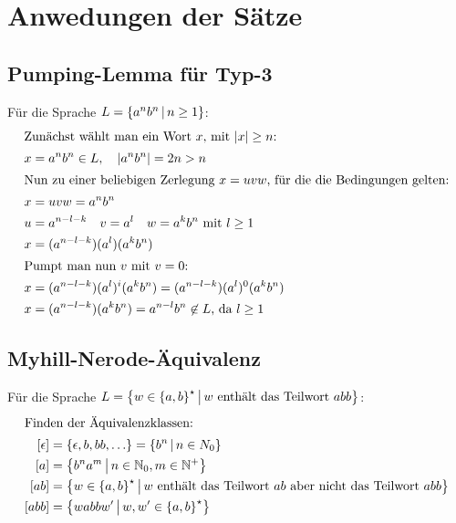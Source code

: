 \chapter{Anwedungen der Sätze}
\section{Pumping-Lemma für Typ-3}\label{bsp:pumpingLemma}
Für die Sprache $L=\left\{ a^nb^n \,\middle|\, n\geq 1 \right\}$:%
\begin{align*}
	\intertext{Zunächst wählt man ein Wort $x$, mit $|x|\geq n$:}
	x&=a^nb^n \in L,\quad |a^nb^n|=2n>n\\
	\intertext{Nun zu einer beliebigen Zerlegung $x=uvw$, für die die Bedingungen gelten:}
	x&=uvw=a^nb^n\\
	u&=a^{n-l-k} \quad v=a^l \quad w=a^k b^n \text{ mit $l\geq 1$}\\
	x&=(a^{n-l-k}) (a^l) (a^k b^n)\\
	\intertext{Pumpt man nun $v$ mit $v=0$:}
	x&=(a^{n-l-k}) (a^l)^i (a^k b^n)=(a^{n-l-k}) (a^l)^0 (a^k b^n)\\
	x&=(a^{n-l-k}) (a^k b^n) = a^{n-l} b^n \not\in L\text{, da $l\geq 1$}\\
\end{align*}


\section{Myhill-Nerode-Äquivalenz}\label{bsp:myhill}
Für die Sprache $L=\left\{ w\in\left\{ a,b \right\}^\star \,\middle|\, w \text{ enthält das Teilwort $abb$} \right\}$:%
\begin{align*}
	\intertext{Finden der Äquivalenzklassen:}
	[\epsilon]&=\left\{ \epsilon, b, bb, \ldots \right\}=\left\{ b^n \,\middle|\, n\in N_0 \right\}\\
	[a]&=\left\{ b^na^m \,\middle|\, n\in\mathbb{N}_0, m\in\mathbb{N}^+ \right\}\\
	[ab]&=\left\{ w\in\left\{ a,b \right\}^\star \,\middle|\, w \text{ enthält das Teilwort $ab$ aber nicht das Teilwort $abb$} \right\}\\
	[abb]&=\left\{ wabbw' \,\middle|\, w,w'\in\left\{ a,b \right\}^\star \right\}
\end{align*}


